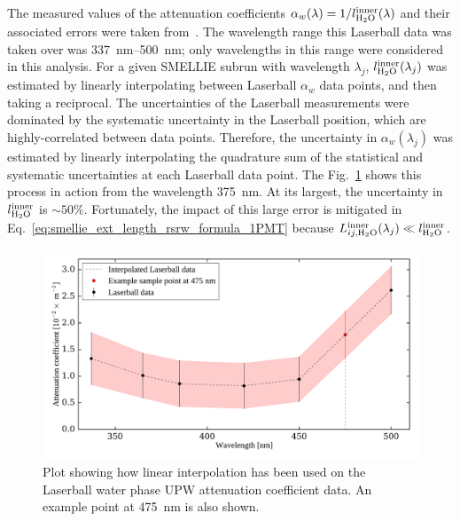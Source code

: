 The measured values of the attenuation coefficients $\alpha_{w}(\lambda) = 1/l_{\ce{H_{2}O}}^{\mathrm{inner}}(\lambda)$ and their associated errors were taken from~\cite{andersonOpticalCalibrationSNO2021}. The wavelength range this Laserball data was taken over was \SIrange{337}{500}{\nm}; only wavelengths in this range were considered in this analysis. For a given SMELLIE subrun with wavelength $\lambda_{j}$, $l_{\ce{H_{2}O}}^{\mathrm{inner}}(\lambda_{j})$ was estimated by linearly interpolating between Laserball $\alpha_{w}$ data points, and then taking a reciprocal. The uncertainties of the Laserball measurements were dominated by the systematic uncertainty in the Laserball position, which are highly-correlated between data points. Therefore, the uncertainty in $\alpha_{w}(\lambda_{j})$ was estimated by linearly interpolating the quadrature sum of the statistical and systematic uncertainties at each Laserball data point. The 
Fig.~\ref{fig:smellie_laserball_water_ext_length_est} shows this process in action from the wavelength \SI{375}{\nm}. At its largest, the uncertainty in $l_{\ce{H_{2}O}}^{\mathrm{inner}}$ is $\sim50\%$. Fortunately, the impact of this large error is mitigated in Eq.~\ref{eq:smellie_ext_length_rsrw_formula_1PMT} because $L_{ij,\ce{H_{2}O}}^{\mathrm{inner}}(\lambda_{j})\ll l_{\ce{H_{2}O}}^{\mathrm{inner}}$.

\begin{figure}
    \centering
    \includegraphics[width=\textwidth]{5_SMELLIEAnalysis/images/OCA_water_atten_coeffs_with_interploation.pdf}
    \caption[Linear interpolation being used on Laserball UPW attenuation coefficient data]
    {Plot showing how linear interpolation has been used on the Laserball water phase UPW attenuation coefficient data. An example point at \SI{475}{\nm} is also shown.}
    \label{fig:smellie_laserball_water_ext_length_est}
\end{figure}

